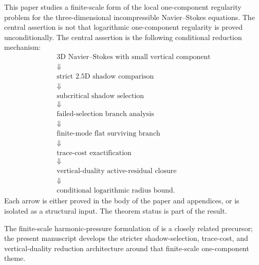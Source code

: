 \documentclass[11pt]{article}
\numberwithin{equation}{section}
\theoremstyle{plain}
\theoremstyle{definition}
\theoremstyle{remark}
\begin{document}
This paper studies a finite-scale form of the local one-component regularity problem for the three-dimensional incompressible Navier--Stokes equations.  The central assertion is not that logarithmic one-component regularity is proved unconditionally.  The central assertion is the following conditional reduction mechanism:
\[
\begin{array}{c}
\text{3D Navier--Stokes with small vertical component}\\
\Downarrow\\[-1mm]
\text{strict 2.5D shadow comparison}\\
\Downarrow\\[-1mm]
\text{subcritical shadow selection}\\
\Downarrow\\[-1mm]
\text{failed-selection branch analysis}\\
\Downarrow\\[-1mm]
\text{finite-mode flat surviving branch}\\
\Downarrow\\[-1mm]
\text{trace-cost exactification}\\
\Downarrow\\[-1mm]
\text{vertical-duality active-residual closure}\\
\Downarrow\\[-1mm]
\text{conditional logarithmic radius bound}.
\end{array}
\]
Each arrow is either proved in the body of the paper and appendices, or is isolated as a structural input.  The theorem status is part of the result.

The finite-scale harmonic-pressure formulation of \cite{Yu2026HarmonicPressure} is a closely related precursor; the present manuscript develops the stricter shadow-selection, trace-cost, and vertical-duality reduction architecture around that finite-scale one-component theme.
\end{document}

